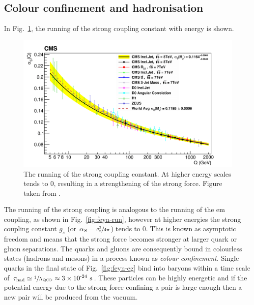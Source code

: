 \subsection{Colour confinement and hadronisation} %
\label{sub:confinement}
In Fig.~\ref{fig:alphaSrunning}, the running of the strong coupling constant with energy is shown.
\begin{figure}[h!]
	\centering
	\includegraphics[width=\textwidth]{Figures/alphaS}
	\caption[The running of the strong coupling constant. At higher energy scales \alpS{} tends to 0, resulting in a strengthening of the strong force.]{The running of the strong coupling constant. At higher energy scales \alpS{} tends to 0, resulting in a strengthening of the strong force. Figure taken from \cite{alphaSrunning}.}
	\label{fig:alphaSrunning}
\end{figure}
The running of the strong coupling is analogous to the running of the \acrshort{em} coupling, as shown in Fig.~\ref{fig:feyn-run}, however at higher energies the strong coupling constant $g_{s}$ (or $\alpha_S = \sfrac{g_{s}^{2}}{4\pi}$) tends to 0.
This is known as asymptotic freedom and means that the strong force becomes stronger at larger quark or gluon separations.
The quarks and gluons are consequently bound in colourless states (hadrons and mesons) in a process known as \textit{colour confinement}.
Single quarks in the final state of Fig.~\ref{fig:feyn-eg} bind into baryons within a time scale of $\tau_{\mathrm{had}} \simeq \sfrac{1}{\Lambda_{\mathrm{QCD}}} \approx 3\times \text{10}^\text{-24}\mathrm{~s}^{}$.
These particles can be highly energetic and if the potential energy due to the strong force confining a \qqbar{} pair is large enough then a new \qqbar{} pair will be produced from the vacuum. 
